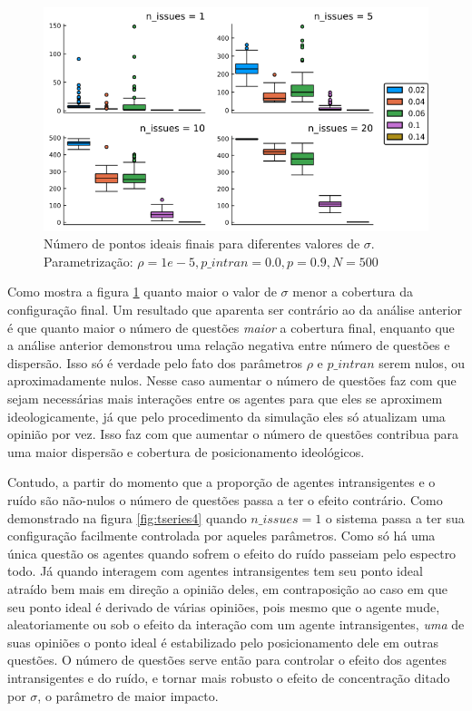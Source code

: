   \begin{figure}[H]
    \centering
    \includegraphics[scale=0.7]{ims/boxes4.png}
    \caption{Número de pontos ideais finais para diferentes valores de \(\sigma\).
      Parametrização: \(\rho =1e-5, p\_intran = 0.0, p = 0.9, N =500\)}
    \label{fig:box4}
  \end{figure}
  
  Como mostra a figura \ref{fig:box4} quanto maior o valor de \(\sigma\) menor a
  cobertura da configuração final. Um resultado que aparenta ser contrário ao da
  análise anterior é que quanto maior o número de questões \textit{maior} a
  cobertura final, enquanto que a análise anterior demonstrou uma relação
  negativa entre número de questões e dispersão. Isso só é verdade pelo fato dos
  parâmetros \(\rho\) e \(p\_intran\) serem nulos, ou aproximadamente nulos. Nesse
  caso aumentar o número de questões faz com que sejam necessárias mais
  interações entre os agentes para que eles se aproximem ideologicamente, já que
  pelo procedimento da simulação eles só atualizam uma opinião por vez. Isso faz
  com que aumentar o número de questões contribua para uma maior dispersão e
  cobertura de posicionamento ideológicos.
  
  Contudo, a partir do momento que a proporção de agentes intransigentes e o
  ruído são não-nulos o número de questões passa a ter o efeito contrário. Como
  demonstrado na figura \ref{fig:tseries4} quando \(n\_issues = 1\) o sistema
  passa a ter sua configuração facilmente controlada por aqueles parâmetros.
  Como só há uma única questão os agentes quando sofrem o efeito do ruído
  passeiam pelo espectro todo. Já quando interagem com agentes intransigentes
  tem seu ponto ideal atraído bem mais em direção a opinião deles, em
  contraposição ao caso em que seu ponto ideal é derivado de várias opiniões,
  pois mesmo que o agente mude, aleatoriamente ou sob o efeito da interação com
  um agente intransigentes, \textit{uma} de suas opiniões o ponto ideal é
  estabilizado pelo posicionamento dele em outras questões. O número de questões
  serve então para controlar o efeito dos agentes intransigentes e do ruído, e
  tornar mais robusto o efeito de concentração ditado por \(\sigma\), o parâmetro de
  maior impacto.


